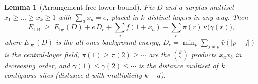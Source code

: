 \documentclass[11pt]{article}
\newtheorem{lemma}{Lemma}
\theoremstyle{remark}
\newcommand{\LB}{\mathrm{LB}}
\newcommand{\bg}{\mathrm{bg}}
\begin{document}
\begin{lemma}[Arrangement-free lower bound]\label{lem:free}
Fix $D$ and a surplus multiset $x_1\ge\dots\ge x_k\ge1$ with $\sum_a x_a=e$, placed in $k$ distinct layers in any way. Then
\begin{equation}\label{eq:lem2}
E_\LB \;\ge\; E_\bg(D) + e\,D_c + \sum_a f(1+x_a) - \sum_r \pi(r)\,\kappa\bigl(\gamma(r)\bigr),
\end{equation}
where $E_\bg(D)$ is the all-ones background energy, $D_c=\min_p \sum_{j\ne p}\bar v(|p-j|)$ is the central-layer field, $\pi(1)\ge\pi(2)\ge\cdots$ are the $\binom k2$ products $x_a x_b$ in decreasing order, and $\gamma(1)\le\gamma(2)\le\cdots$ is the distance multiset of $k$ contiguous sites (distance $d$ with multiplicity $k-d$).
\end{lemma}
\end{document}
